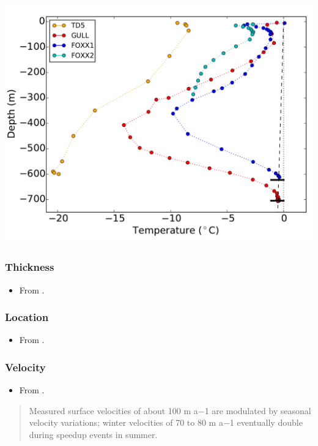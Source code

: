 \documentclass[article,a4paper,times,11pt,twoside]{article}
\begin{document}
\begin{center}
\includegraphics[width=.9\linewidth]{foxx2/luthi_2015_fig2_all.png}
\end{center}


\subsubsection{Thickness}
\label{sec:org0da1733}

\begin{itemize}
\item From \textcite{ryser_2014_caterpillar}.
\end{itemize}

\subsubsection{Location}
\label{sec:org97c329f}

\begin{itemize}
\item From \textcite{ryser_2014_caterpillar}.
\end{itemize}

\subsubsection{Velocity}
\label{sec:org6c2d7e0}

\begin{itemize}
\item From \textcite{ryser_2014_caterpillar}.
\end{itemize}

\begin{quote}
Measured surface velocities of about 100 m a−1 are
modulated by seasonal velocity variations; winter
velocities of 70 to 80 m a−1 eventually double during
speedup events in summer. 
\end{quote}
\clearpage
\end{document}
